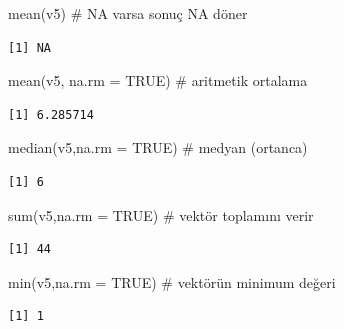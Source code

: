 \documentclass[
  letterpaper,
  DIV=11,
  numbers=noendperiod]{scrreprt}
\newenvironment{Shaded}{\begin{snugshade}}{\end{snugshade}}
\newcommand{\AttributeTok}[1]{\textcolor[rgb]{0.40,0.45,0.13}{#1}}
\newcommand{\CommentTok}[1]{\textcolor[rgb]{0.37,0.37,0.37}{#1}}
\newcommand{\ConstantTok}[1]{\textcolor[rgb]{0.56,0.35,0.01}{#1}}
\newcommand{\FunctionTok}[1]{\textcolor[rgb]{0.28,0.35,0.67}{#1}}
\newcommand{\NormalTok}[1]{\textcolor[rgb]{0.00,0.23,0.31}{#1}}
\begin{document}
\begin{Shaded}
\begin{Highlighting}[]
\FunctionTok{mean}\NormalTok{(v5) }\CommentTok{\# NA varsa sonuç NA döner}
\end{Highlighting}
\end{Shaded}

\begin{verbatim}
[1] NA
\end{verbatim}

\begin{Shaded}
\begin{Highlighting}[]
\FunctionTok{mean}\NormalTok{(v5, }\AttributeTok{na.rm =} \ConstantTok{TRUE}\NormalTok{) }\CommentTok{\# aritmetik ortalama}
\end{Highlighting}
\end{Shaded}

\begin{verbatim}
[1] 6.285714
\end{verbatim}

\begin{Shaded}
\begin{Highlighting}[]
\FunctionTok{median}\NormalTok{(v5,}\AttributeTok{na.rm =} \ConstantTok{TRUE}\NormalTok{) }\CommentTok{\# medyan (ortanca)}
\end{Highlighting}
\end{Shaded}

\begin{verbatim}
[1] 6
\end{verbatim}

\begin{Shaded}
\begin{Highlighting}[]
\FunctionTok{sum}\NormalTok{(v5,}\AttributeTok{na.rm =} \ConstantTok{TRUE}\NormalTok{) }\CommentTok{\# vektör toplamını verir}
\end{Highlighting}
\end{Shaded}

\begin{verbatim}
[1] 44
\end{verbatim}

\begin{Shaded}
\begin{Highlighting}[]
\FunctionTok{min}\NormalTok{(v5,}\AttributeTok{na.rm =} \ConstantTok{TRUE}\NormalTok{) }\CommentTok{\# vektörün minimum değeri}
\end{Highlighting}
\end{Shaded}

\begin{verbatim}
[1] 1
\end{verbatim}
\end{document}
